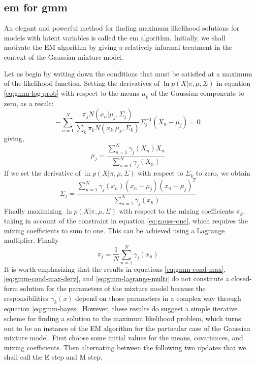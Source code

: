 \documentclass[12pt, a4paper, twoside]{report}
\begin{document}
\subsection{\acrlong{em} for \acrshort{gmm}}
An elegant and powerful method for finding maximum likelihood solutions for models with latent variables is called the \acrfull{em} algorithm. Initially, we shall motivate the EM algorithm by giving a relatively informal treatment in the context of the Gaussian mixture model.
\par
Let us begin by writing down the conditions that must be satisfied at a maximum of the likelihood function. Setting the derivatives of $\ln p(X |\pi, \mu, \Sigma)$ in equation \ref{eq:gmm-log-prob} with respect to the means $\mu_k$ of the Gaussian components to zero, as a result:
\begin{equation*}
-\sum_{n=1}^{N}\frac{\pi_j N(x_n|\mu_j,\Sigma_j)}{\sum_{k}\pi_k N(x_k|\mu_k,\Sigma_k)} \Sigma_{j}^{-1}(X_n - \mu_j) = 0
\end{equation*}
giving,
\begin{equation}
\mu_j = \frac{\sum_{n=1}^{N}\gamma_j(X_n)X_n}{\sum_{n=1}^{N}\gamma_j(X_n)}
\label{eq:gmm-cond-max}
\end{equation}
If we set the derivative of $\ln p(X |\pi, \mu, \Sigma)$ with respect to $\Sigma_k$ to zero, we obtain
\begin{equation}
\Sigma_j = \frac{\sum_{n=1}^{N}\gamma_j(x_n)(x_n - \mu_j)(x_n-\mu_j)^T}{\sum_{n=1}^{N}\gamma_j(x_n)}
\label{eq:gmm-cond-max-derv}
\end{equation}
Finally maximizing $\ln p(X |\pi, \mu, \Sigma)$ with respect to the mixing coefficients $\pi_k$. taking in account of the constraint in equation \ref{eq:gauss-one}, which requires the mixing coefficients to sum to one. This can be achieved using a Lagrange multiplier. Finally
\begin{equation}
\pi_j = \frac{1}{N}\sum_{n=1}^{N}\gamma_j(x_n)
\label{eq:gmm-lagrange-multi}
\end{equation}
It is worth emphasizing that the results in equations \ref{eq:gmm-cond-max}, \ref{eq:gmm-cond-max-derv}, and \ref{eq:gmm-lagrange-multi} do not constitute a closed-form solution for the parameters of the mixture model because the responsibilities $\gamma_k(x)$ depend on those parameters in a complex way through equation \ref{eq:gmm-bayes}. However, these results do suggest a simple iterative scheme for finding a solution to the maximum likelihood problem, which turns out to be an instance of the EM algorithm for the particular case of the Gaussian mixture model. First choose some initial values for the means, covariances, and mixing coefficients. Then alternating between the following two updates that we shall call the E step and M step.
\end{document}

